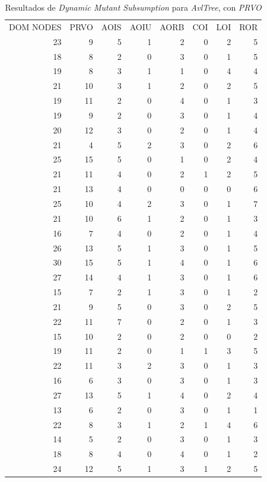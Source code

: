 \begin{table}[]
	\caption[\emph{Dynamic Mutant Subsumption} \emph{AvlTree}, con \emph{PRVO}]{Resultados de \emph{Dynamic Mutant Subsumption} para \emph{AvlTree}, con \emph{PRVO}}
	\label{tables.results.subsumption.avltree.prvo}
	\centering
	\scriptsize
	\def\arraystretch{0.95}
	\setlength\tabcolsep{0.5mm}
	\begin{tabular}{rrrrrrrr}
		DOM NODES & PRVO & AOIS & AOIU & AORB & COI & LOI & ROR \\
		23 & 9 & 5 & 1 & 2 & 0 & 2 & 5 \\
		18 & 8 & 2 & 0 & 3 & 0 & 1 & 5 \\
		19 & 8 & 3 & 1 & 1 & 0 & 4 & 4 \\
		21 & 10 & 3 & 1 & 2 & 0 & 2 & 5 \\
		19 & 11 & 2 & 0 & 4 & 0 & 1 & 3 \\
		19 & 9 & 2 & 0 & 3 & 0 & 1 & 4 \\
		20 & 12 & 3 & 0 & 2 & 0 & 1 & 4 \\
		21 & 4 & 5 & 2 & 3 & 0 & 2 & 6 \\
		25 & 15 & 5 & 0 & 1 & 0 & 2 & 4 \\
		21 & 11 & 4 & 0 & 2 & 1 & 2 & 5 \\
		21 & 13 & 4 & 0 & 0 & 0 & 0 & 6 \\
		25 & 10 & 4 & 2 & 3 & 0 & 1 & 7 \\
		21 & 10 & 6 & 1 & 2 & 0 & 1 & 3 \\
		16 & 7 & 4 & 0 & 2 & 0 & 1 & 4 \\
		26 & 13 & 5 & 1 & 3 & 0 & 1 & 5 \\
		30 & 15 & 5 & 1 & 4 & 0 & 1 & 6 \\
		27 & 14 & 4 & 1 & 3 & 0 & 1 & 6 \\
		15 & 7 & 2 & 1 & 3 & 0 & 1 & 2 \\
		21 & 9 & 5 & 0 & 3 & 0 & 2 & 5 \\
		22 & 11 & 7 & 0 & 2 & 0 & 1 & 3 \\
		15 & 10 & 2 & 0 & 2 & 0 & 0 & 2 \\
		19 & 11 & 2 & 0 & 1 & 1 & 3 & 5 \\
		22 & 11 & 3 & 2 & 3 & 0 & 1 & 3 \\
		16 & 6 & 3 & 0 & 3 & 0 & 1 & 3 \\
		27 & 13 & 5 & 1 & 4 & 0 & 2 & 4 \\
		13 & 6 & 2 & 0 & 3 & 0 & 1 & 1 \\
		22 & 8 & 3 & 1 & 2 & 1 & 4 & 6 \\
		14 & 5 & 2 & 0 & 3 & 0 & 1 & 3 \\
		18 & 8 & 4 & 0 & 4 & 0 & 1 & 2 \\
		24 & 12 & 5 & 1 & 3 & 1 & 2 & 5
	\end{tabular}
\end{table}

